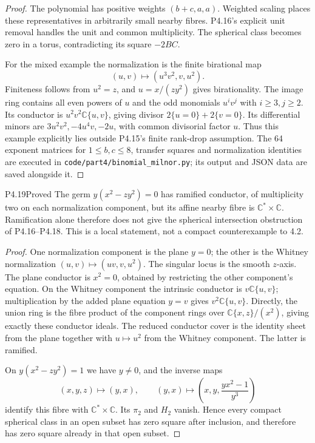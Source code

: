 \begin{proof}
The polynomial has positive weights $(b+c,a,a)$. Weighted
scaling places these representatives in arbitrarily small
nearby fibres. P4.16's explicit unit removal handles the unit
and common multiplicity. The spherical class becomes zero
in a torus, contradicting its square $-2BC$.

For the mixed example the normalization is the finite
birational map
\[
 (u,v)\longmapsto(u^3v^2,v,u^2).
\]
Finiteness follows from $u^2=z$, and $u=x/(zy^2)$ gives
birationality. The image ring contains all even powers of $u$
and the odd monomials $u^iv^j$ with $i\geq3,j\geq2$.
Its conductor is $u^2v^2\mathbb C\{u,v\}$, giving divisor
$2\{u=0\}+2\{v=0\}$. Its differential minors are
$3u^2v^2,-4u^4v,-2u$, with common divisorial factor $u$.
Thus this example explicitly lies outside P4.15's finite
rank-drop assumption. The 64 exponent matrices for
$1\leq b,c\leq8$, transfer squares and normalization
identities are executed in
\texttt{code/part4/binomial\_milnor.py}; its output and
JSON data are saved alongside it.
\end{proof}

\begin{statement}{P4.19}{Proved}
The germ $y(x^2-zy^2)=0$ has ramified conductor, of multiplicity
two on each normalization component, but its affine nearby
fibre is $\mathbb C^*\times\mathbb C$. Ramification alone
therefore does not give the spherical intersection obstruction
of P4.16--P4.18. This is a local statement, not a compact
counterexample to 4.2.
\end{statement}
\begin{proof}
One normalization component is the plane $y=0$; the other is
the Whitney normalization $(u,v)\mapsto(uv,v,u^2)$.
The singular locus is the smooth $z$-axis. The plane conductor
is $x^2=0$, obtained by restricting the other component's
equation. On the Whitney component the intrinsic conductor
is $v\mathbb C\{u,v\}$; multiplication by the added plane
equation $y=v$ gives $v^2\mathbb C\{u,v\}$. Directly, the
union ring is the fibre product of the component rings over
$\mathbb C\{x,z\}/(x^2)$, giving exactly these conductor ideals.
The reduced conductor cover is the identity sheet from the
plane together with $u\mapsto u^2$ from the Whitney component.
The latter is ramified.

On $y(x^2-zy^2)=1$ we have $y\ne0$, and the inverse maps
\[
 (x,y,z)\longmapsto(y,x),\qquad
 (y,x)\longmapsto\left(x,y,\frac{yx^2-1}{y^3}\right)
\]
identify this fibre with $\mathbb C^*\times\mathbb C$.
Its $\pi_2$ and $H_2$ vanish. Hence every compact spherical
class in an open subset has zero square after inclusion,
and therefore has zero square already in that open subset.
\end{proof}

